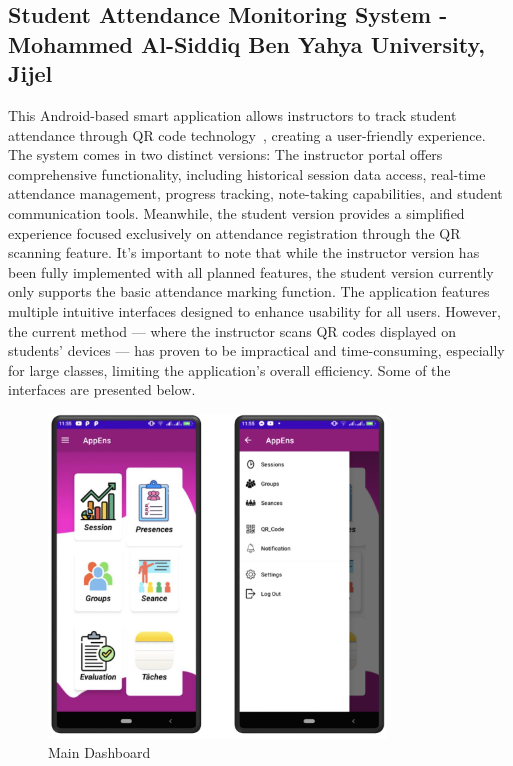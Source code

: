 \documentclass[12pt,a4paper]{report}
\begin{document}
\subsection{Student Attendance Monitoring System - Mohammed Al-Siddiq Ben Yahya University, Jijel}
This Android-based smart application allows instructors to track student attendance through QR code technology~\cite{rayane2022}, creating a user-friendly experience. The system comes in two distinct versions:
The instructor portal offers comprehensive functionality, including historical session data access, real-time attendance management, progress tracking, note-taking capabilities, and student communication tools. Meanwhile, the student version provides a simplified experience focused exclusively on attendance registration through the QR scanning feature.
It's important to note that while the instructor version has been fully implemented with all planned features, the student version currently only supports the basic attendance marking function. The application features multiple intuitive interfaces designed to enhance usability for all users. However, the current method — where the instructor scans QR codes displayed on students' devices — has proven to be impractical and time-consuming, especially for large classes, limiting the application's overall efficiency.
Some of the interfaces are presented below.
\begin{figure}[htbp]
    \centering
    \includegraphics[width=0.8\textwidth]{images/morsli/rayane_jijel.png}
    \caption{Main Dashboard}
    \label{fig:attendance-system}
\end{figure}
\end{document}
